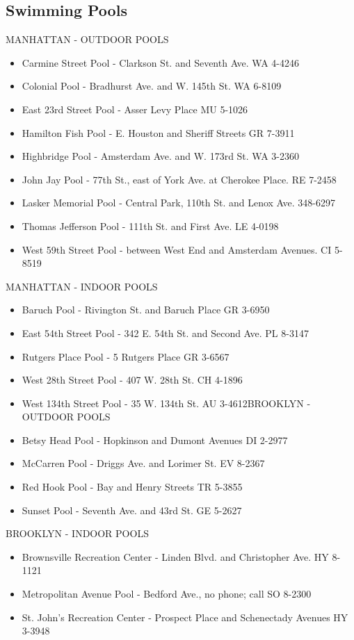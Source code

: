 \documentclass[11pt,twoside,a4paper]{book}
\begin{document}
\subsection{Swimming Pools}
MANHATTAN - OUTDOOR POOLS~\\
\begin{itemize}
	\item Carmine Street Pool - Clarkson St. and Seventh Ave. WA 4-4246 
	\item Colonial Pool - Bradhurst Ave. and W. 145th St. WA 6-8109
	\item East 23rd Street Pool - Asser Levy Place MU 5-1026 
	\item Hamilton Fish Pool - E. Houston and Sheriff Streets GR 7-3911 
	\item Highbridge Pool - Amsterdam Ave. and W. 173rd St. WA 3-2360 
	\item John Jay Pool - 77th St., east of York Ave. at Cherokee Place. RE 7-2458 
	\item Lasker Memorial Pool - Central Park, 110th St. and Lenox Ave. 348-6297 
	\item Thomas Jefferson Pool - 111th St. and First Ave. LE 4-0198 
	\item West 59th Street Pool - between West End and Amsterdam Avenues. CI 5-8519
\end{itemize}

MANHATTAN - INDOOR POOLS 
\begin{itemize}
	\item Baruch Pool - Rivington St. and Baruch Place GR 3-6950 
	\item East 54th Street Pool - 342 E. 54th St. and Second Ave. PL 8-3147 
	\item Rutgers Place Pool - 5 Rutgers Place GR 3-6567 
	\item West 28th Street Pool - 407 W. 28th St. CH 4-1896 
	\item West 134th Street Pool - 35 W. 134th St. AU 3-4612BROOKLYN - OUTDOOR POOLS \item Betsy Head Pool - Hopkinson and Dumont Avenues DI 2-2977 
	\item McCarren Pool - Driggs Ave. and Lorimer St. EV 8-2367 \item Red Hook Pool - Bay and Henry Streets TR 5-3855 
	\item Sunset Pool - Seventh Ave. and 43rd St. GE 5-2627
\end{itemize}

BROOKLYN - INDOOR POOLS
\begin{itemize}
	\item Brownsville Recreation Center - Linden Blvd. and Christopher Ave. HY 8-1121 
	\item Metropolitan Avenue Pool - Bedford Ave., no phone; call SO 8-2300 
	\item St. John's Recreation Center - Prospect Place and Schenectady Avenues HY 3-3948
\end{itemize}
\end{document}

